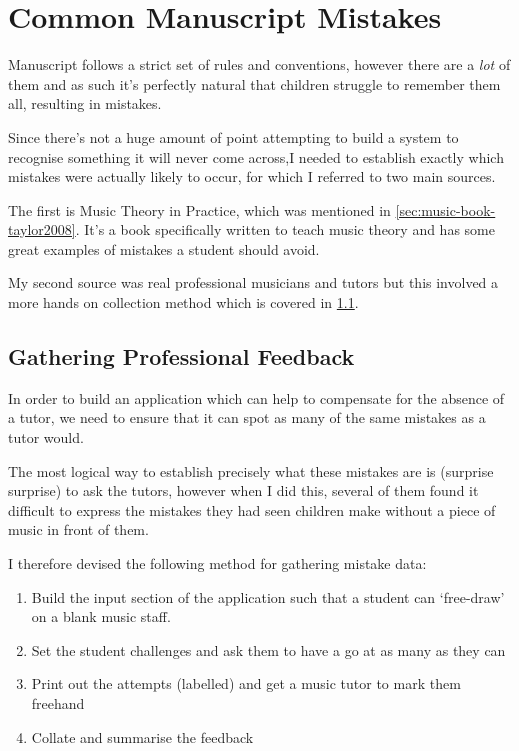 \section{Common Manuscript Mistakes}

Manuscript follows a strict set of rules and conventions, however there are a \emph{lot} of them and as such it's perfectly natural that children struggle to remember them all, resulting in mistakes.

Since there's not a huge amount of point attempting to build a system to recognise something it will never come across,I needed to establish exactly which mistakes were actually likely to occur, for which I referred to two main sources.

The first is Music Theory in Practice, \parencite{taylor2008music} which was mentioned in \cref{sec:music-book-taylor2008}. It's a book specifically written to teach music theory and has some great examples of mistakes a student should avoid.

My second source was real professional musicians and tutors but this involved a more hands on collection method which is covered in \cref{sec:teacher-data-gathering}.

\subsection{Gathering Professional Feedback}
\label{sec:teacher-data-gathering}

In order to build an application which can help to compensate for the absence of a tutor, we need to ensure that it can spot as many of the same mistakes as a tutor would.

The most logical way to establish precisely what these mistakes are is (surprise surprise) to ask the tutors, however when I did this, several of them found it difficult to express the mistakes they had seen children make without a piece of music in front of them.

I therefore devised the following method for gathering mistake data:

\begin{enumerate}
  \item Build the input section of the application such that a student can `free-draw' on a blank music staff.
  \item Set the student challenges and ask them to have a go at as many as they can
  \item Print out the attempts (labelled) and get a music tutor to mark them freehand
  \item Collate and summarise the feedback
\end{enumerate}

